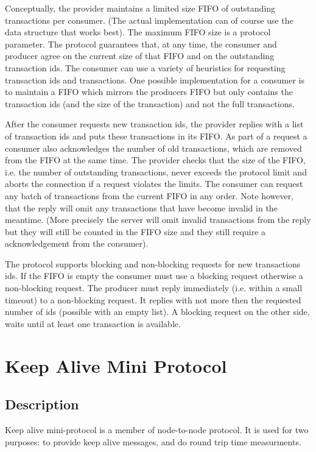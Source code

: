 Conceptually, the provider maintains a limited size FIFO of outstanding transactions per consumer.
(The actual implementation can of course use the data structure that works best).
The maximum FIFO size is a protocol parameter.
The protocol guarantees that, at any time, the consumer and producer agree on the current size of
that FIFO and on the outstanding transaction ids.
The consumer can use a variety of heuristics for requesting transaction ids and transactions.
One possible implementation for a consumer is to maintain a FIFO which mirrors the producers FIFO
but only contains the transaction ids (and the size of the transaction) and not the full transactions.

After the consumer requests new transaction ids, the provider replies with a list of transaction ids and
puts these transactions in its FIFO.
As part of a request a consumer also acknowledges the number of old transactions,
which are removed from the FIFO at the same time.
The provider checks that the size of the FIFO, i.e. the number of outstanding transactions,
never exceeds the protocol limit and aborts the connection if a request violates the limits.
The consumer can request any batch of transactions from the current FIFO in any order.
Note however, that the reply will omit any transactions that have become invalid in the meantime.
(More precisely the server will omit invalid transactions from the reply but they will still be counted in the FIFO
size and they still require a acknowledgement from the consumer).

The protocol supports blocking and non-blocking requests for new transactions ids.
If the FIFO is empty the consumer must use a blocking request
otherwise a non-blocking request.
The producer must reply immediately (i.e. within a small timeout) to a non-blocking request.
It replies with not more then the requested number of ids (possible with an empty list).
A blocking request on the other side, waits until at least one transaction is available.

\section{Keep Alive Mini Protocol}
\label{keep-alive-protocol}
\subsection{Description}
Keep alive mini-protocol is a member of node-to-node protocol.  It is used for
two purposes: to provide keep alive messages, and do round trip time
measurments.

